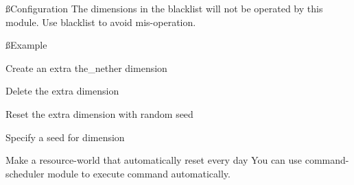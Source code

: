 \ss{Configuration}
The dimensions in the blacklist will not be operated by this module.
Use blacklist to avoid mis-operation.

\ss{Example}
\begin{example}{Create an extra the\_nether dimension}
\end{example}

\begin{example}{Delete the extra dimension}
\end{example}

\begin{example}{Reset the extra dimension with random seed}
\end{example}

\begin{tips}{Specify a seed for dimension}
    \\
\end{tips}

\begin{tips}{Make a resource-world that automatically reset every day}
    You can use command-scheduler module to execute  command automatically.
\end{tips}